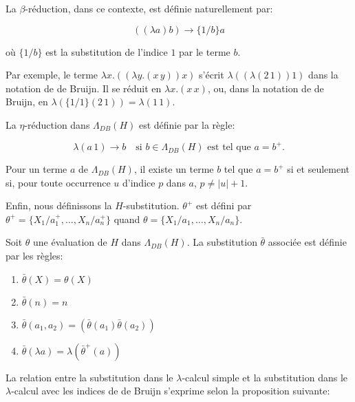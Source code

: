 \begin{defn}
La $\beta$-réduction, dans ce contexte, est définie naturellement par:

\[ ((\lambda a)b) \xrightarrow{}{\{1/b\}} a \]

où $\{1/b\}$ est la substitution de l’indice $1$ par le terme $b$.
\end{defn}

Par exemple, le terme $\lambda x . (( \lambda y . (x \, y)) x)$ s’écrit $\lambda (( \lambda (2 \, 1))1)$ dans la notation de de Bruijn. Il se réduit en $\lambda x . (x \, x)$, ou, dans la notation de de Bruijn, en $\lambda (\{1/1\}(2 \, 1)) = \lambda (1 \, 1)$.

\begin{defn}
La $\eta$-réduction dans $\Lambda_{DB}(H)$ est définie par la règle:

\[ \lambda (a \, 1) \xrightarrow{}{b} \quad \text{si $b \in \Lambda_{DB}(H)$ est tel que $a = b^{+}$.} \]

\end{defn}

\begin{prop}
Pour un terme $a$ de $\Lambda_{DB}(H)$, il existe un terme $b$ tel que $a=b^{+}$ si et seulement si, pour toute occurrence $u$ d’indice $p$ dans $a$, $p \neq |u| + 1$.
\end{prop}

Enfin, nous définissons la $H$-substitution. $\theta^{+}$ est défini par $\theta^{+} = \{X_1/a_1^{+}, \dots, X_n/a_n^{+}\}$ quand $\theta = \{X_1/a_1, \dots , X_n/a_n\}$.

\begin{defn}
Soit $\theta$ une évaluation de $H$ dans $\Lambda_{DB}(H)$. La substitution $\bar{\theta}$ associée est définie par les règles:
\begin{enumerate}
    \item $\bar{\theta} (X) = \theta (X)$
    \item $\bar{\theta} (n) = n$
    \item $\bar{\theta} (a_1,a_2) = (\bar{\theta} (a_1) \bar{\theta} (a_2))$
    \item $\bar{\theta} (\lambda a) = \lambda (\bar{\theta}^{+} (a))$
\end{enumerate}
\end{defn}

La relation entre la substitution dans le $\lambda$-calcul simple et la substitution dans le $\lambda$-calcul avec les indices de de Bruijn s’exprime selon la proposition suivante:

